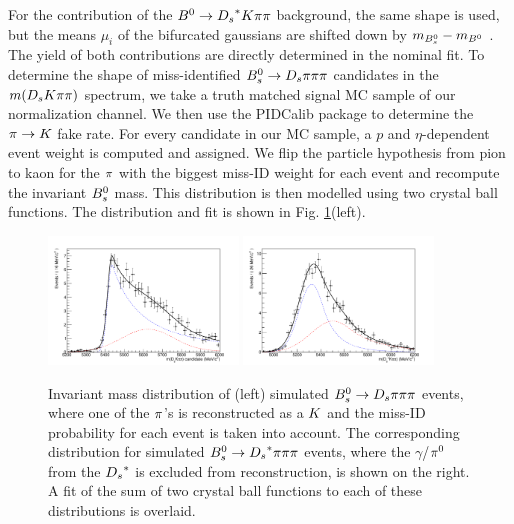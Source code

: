 For the contribution of the ${{B}^0}\rightarrow{\ensuremath{{D}_{s}}}^{*}{K}{\pi}{\pi}$ background, the same shape is used, but the means $\mu_{i}$ of the bifurcated gaussians are shifted down by $m_{{{B}^0_{s}}} - m_{{{B}^0}}$ \cite{Agashe:2014kda}. The yield of both contributions are directly determined in the nominal fit. \newline
To determine the shape of miss-identified ${{B}^0_{s}}\rightarrow{\ensuremath{{D}_{s}}}{\ensuremath{\pi}}{\ensuremath{\pi}}{\ensuremath{\pi}}$ candidates in the $m({{D}_{s}}{K}{\pi}{\pi})$ spectrum, we take a truth matched signal MC sample of our normalization channel. 
We then use the PIDCalib package to determine the ${\pi}\rightarrow{\ensuremath{K}}$ fake rate. For every candidate in our MC sample, a $p$ and $\eta$-dependent event weight is computed and assigned. 
We flip the particle hypothesis from pion to kaon for the ${\pi}$ with the biggest miss-ID weight for each event and recompute the invariant ${{B}^0_{s}}$ mass. This distribution is then modelled using two crystal ball functions. 
The distribution and fit is shown in Fig. \ref{fig: BsDspipipiMCmissID}(left). 

\begin{figure}[h]
\includegraphics[height=6.cm,width=0.45\textwidth]{figs/Bs2Dspipipi_as_DsKpipi.pdf}
\includegraphics[height=6.cm,width=0.45\textwidth]{figs/Bs2Dsstarpipipi_as_DsKpipi.pdf}
\caption{Invariant mass distribution of (left) simulated ${{B}^0_{s}}\rightarrow{\ensuremath{{D}_{s}}}{\ensuremath{\pi}}{\ensuremath{\pi}}{\ensuremath{\pi}}$ events, where one of the ${\pi}$'s is reconstructed as a ${K}$ and the miss-ID probability for each event is taken into account. 
The corresponding distribution for simulated ${{B}^0_{s}}\rightarrow{\ensuremath{{D}_{s}}}^{*}{\pi}{\pi}{\pi}$ events, where the $\gamma$/${{\pi}^0}$ from the ${{D}_{s}}^{*}$ is excluded from reconstruction, is shown on the right.
A fit of the sum of two crystal ball functions to each of these distributions is overlaid.}
\label{fig: BsDspipipiMCmissID}
\end{figure}
 
